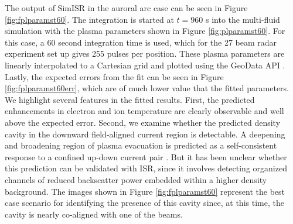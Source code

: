 The output of SimISR in the auroral arc case can be seen in Figure \ref{fig:fplparamst60}. The integration is started at $t=960$ s into the multi-fluid simulation with the plasma parameters shown in Figure \ref{fig:plparamst60}. For this case, a 60 second integration time is used, which for the 27 beam radar experiment set up gives 255 pulses per position. These plasma parameters are linearly interpolated to a Cartesian grid and plotted using the GeoData API \cite{john_swoboda_2016_154533}. Lastly, the expected errors from the fit can be seen in Figure \ref{fig:fplparamst60err}, which are of much lower value that the fitted parameters.
We highlight several features in the fitted results. First, the predicted enhancements in electron and ion temperature are clearly observable and well above the expected error. Second, we examine whether the predicted density cavity in the downward field-aligned current region is  detectable. A deepening and broadening region of plasma evacuation is predicted as a self-consistent response to a confined up-down current pair \cite{cran;cavity}.  But it has been unclear whether this prediction can be validated with ISR, since it involves detecting organized channels of reduced backscatter power embedded within a higher density background.
The images shown in Figure \ref{fig:fplparamst60} represent the best case scenario for identifying the presence of this cavity since, at this time, the cavity is nearly co-aligned with one of the beams. 
